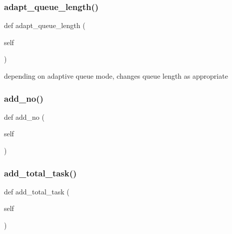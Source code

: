 \mbox{\label{classdynamicfilterapp_1_1models_1_1_predicate_a18b5417d8a8cf64ffbc6bb32c2a573fa}} 
\subsubsection{\texorpdfstring{adapt\_queue\_length()}{adapt\_queue\_length()}}
{\footnotesize\ttfamily def adapt\+\_\+queue\+\_\+length (\begin{DoxyParamCaption}\item[{}]{self }\end{DoxyParamCaption})}

\begin{DoxyVerb}depending on adaptive queue mode, changes queue length as appropriate
\end{DoxyVerb}
 \mbox{\label{classdynamicfilterapp_1_1models_1_1_predicate_adae340e94226ce820610efca7daf16e3}} 
\subsubsection{\texorpdfstring{add\_no()}{add\_no()}}
{\footnotesize\ttfamily def add\+\_\+no (\begin{DoxyParamCaption}\item[{}]{self }\end{DoxyParamCaption})}

\mbox{\label{classdynamicfilterapp_1_1models_1_1_predicate_abc989a62ab5e42f27e19abb3f0744d0d}} 
\subsubsection{\texorpdfstring{add\_total\_task()}{add\_total\_task()}}
{\footnotesize\ttfamily def add\+\_\+total\+\_\+task (\begin{DoxyParamCaption}\item[{}]{self }\end{DoxyParamCaption})}


